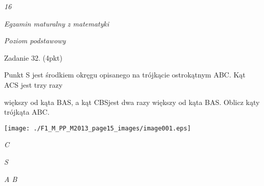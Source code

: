 \documentclass[a4paper,12pt]{article}
\begin{document}
{\it 16}

{\it Egzamin maturalny z matematyki}

{\it Poziom podstawowy}

Zadanie 32. (4pkt)

Punkt S jest środkiem okręgu opisanego na trójkącie ostrokątnym ABC. Kąt ACS jest trzy razy

większy od kąta BAS, a kąt CBSjest dwa razy większy od kąta BAS. Oblicz kąty trójkąta ABC.
\begin{center}
\texttt{[image: ./F1\_M\_PP\_M2013\_page15\_images/image001.eps]}
\end{center}
{\it C}

{\it S}

{\it A  B}
\end{document}
